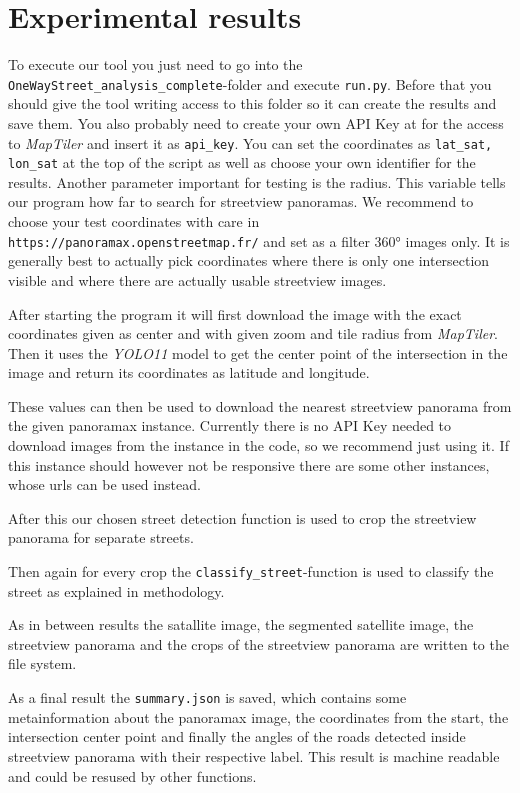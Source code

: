 \section{Experimental results}

To execute our tool you just need to go into the
\texttt{OneWayStreet\_analysis\_complete}-folder and execute \texttt{run.py}.
Before that you should give the tool writing access to this folder so it can
create the results and save them. You also probably need to create your own
API Key at  for the access to \textit{MapTiler} and insert it as \texttt{api\_key}.
You can set the coordinates as \texttt{lat\_sat, lon\_sat} at the top of the script
as well as choose your own identifier for the results. Another parameter
important for testing is the radius. This variable tells our program how far to
search for streetview panoramas.
We recommend to choose your test coordinates with care in
\texttt{https://panoramax.openstreetmap.fr/} and set as a filter 360° images only.
It is generally best to actually pick coordinates where there is only one
intersection visible and where there are actually usable streetview images.

After starting the program it will first download the image with the exact
coordinates given as center and with given zoom and tile radius from
\textit{MapTiler}.
Then it uses the \textit{YOLO11} model to get the center point of the
intersection in the image and return its coordinates as latitude and longitude.

These values can then be used to download the nearest streetview panorama from
the given panoramax instance. Currently there is no API Key needed to
download images from the instance in the code, so we recommend just using it.
If this instance should however not be responsive there are some other instances,
whose urls can be used instead.

After this our chosen street detection function is used to crop the streetview
panorama for separate streets.

Then again for every crop the \texttt{classify\_street}-function is used to
classify the street as explained in methodology.

As in between results the satallite image, the segmented satellite image,
the streetview panorama and the crops of the streetview panorama are written
to the file system.

As a final result the \texttt{summary.json} is saved, which contains some metainformation
about the panoramax image, the coordinates from the start, the intersection center point
and finally the angles of the roads detected inside streetview panorama with
their respective label. This result is machine readable and could be resused by
other functions.

